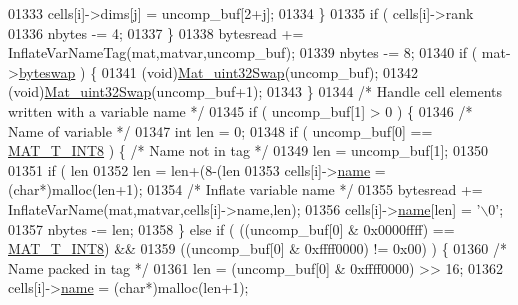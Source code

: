 \begin{DoxyCode}
{{{{{{{{01333                             cells[i]->dims[j] = uncomp\_buf[2+j];
01334                     \}
01335                     \textcolor{keywordflow}{if} ( cells[i]->rank %
01336                         nbytes -= 4;
01337                 \}
01338                 bytesread += InflateVarNameTag(mat,matvar,uncomp\_buf);
01339                 nbytes -= 8;
01340                 \textcolor{keywordflow}{if} ( mat->\hyperlink{struct__mat__t_a99d207977af5e04941ace56d71817a40}{byteswap} ) \{
01341                     (void)\hyperlink{endian_8c_a8cb0d0750e2eaf9840d95db531934f4f}{Mat\_uint32Swap}(uncomp\_buf);
01342                     (void)\hyperlink{endian_8c_a8cb0d0750e2eaf9840d95db531934f4f}{Mat\_uint32Swap}(uncomp\_buf+1);
01343                 \}
01344                 \textcolor{comment}{/* Handle cell elements written with a variable name */}
01345                 \textcolor{keywordflow}{if} ( uncomp\_buf[1] > 0 ) \{
01346                     \textcolor{comment}{/* Name of variable */}
01347                     \textcolor{keywordtype}{int} len = 0;
01348                     \textcolor{keywordflow}{if} ( uncomp\_buf[0] == \hyperlink{group___m_a_t_ggacf7b3b879282b7ab3a51190e49bf3453a9807f5033ed4f9b548953742d9fd1658}{MAT\_T\_INT8} ) \{    \textcolor{comment}{/* Name not in tag */}
01349                         len = uncomp\_buf[1];
01350 
01351                         \textcolor{keywordflow}{if} ( len %
01352                             len = len+(8-(len %
01353                         cells[i]->\hyperlink{group___m_a_t_a5d4b55b041e3b4fb50c04337f05ad909}{name} = (\textcolor{keywordtype}{char}*)malloc(len+1);
01354                         \textcolor{comment}{/* Inflate variable name */}
01355                         bytesread += InflateVarName(mat,matvar,cells[i]->name,len);
01356                         cells[i]->\hyperlink{group___m_a_t_a5d4b55b041e3b4fb50c04337f05ad909}{name}[len] = \textcolor{charliteral}{'\(\backslash\)0'};
01357                         nbytes -= len;
01358                     \} \textcolor{keywordflow}{else} \textcolor{keywordflow}{if} ( ((uncomp\_buf[0] & 0x0000ffff) == \hyperlink{group___m_a_t_ggacf7b3b879282b7ab3a51190e49bf3453a9807f5033ed4f9b548953742d9fd1658}{MAT\_T\_INT8}) &&
01359                                ((uncomp\_buf[0] & 0xffff0000) != 0x00) ) \{
01360                         \textcolor{comment}{/* Name packed in tag */}
01361                         len = (uncomp\_buf[0] & 0xffff0000) >> 16;
01362                         cells[i]->\hyperlink{group___m_a_t_a5d4b55b041e3b4fb50c04337f05ad909}{name} = (\textcolor{keywordtype}{char}*)malloc(len+1);
}}}}}}}}
\end{DoxyCode}
